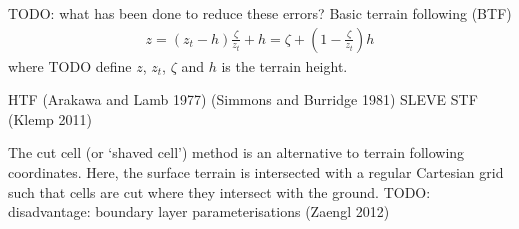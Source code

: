 TODO: what has been done to reduce these errors?
Basic terrain following (BTF) \autocite{galchen1975} 
\begin{align}
z = \left( z_t - h \right) \frac{\zeta}{z_t} + h = \zeta + \left( 1 - \frac{\zeta}{z_t} \right) h
\end{align}
where TODO define $z$, $z_t$, $\zeta$ and $h$ is the terrain height.

HTF (Arakawa and Lamb 1977) (Simmons and Burridge 1981)
SLEVE
STF (Klemp 2011)

The cut cell (or `shaved cell')  method is an alternative to terrain following coordinates.  Here, the surface terrain is intersected with a regular Cartesian grid such that cells are cut where they intersect with the ground.  TODO: disadvantage: boundary layer parameterisations (Zaengl 2012)
